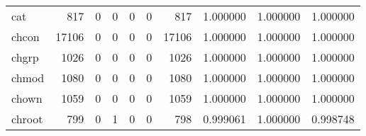 \begin{longtable}{lrrrrrrrrr}
cat       &                                                817 &                                                  0 &                                                  0 &                                                  0 &                                                  0 &                                                817 &                                           1.000000 &                               1.000000 &                             1.000000 \\
chcon     &                                              17106 &                                                  0 &                                                  0 &                                                  0 &                                                  0 &                                              17106 &                                           1.000000 &                               1.000000 &                             1.000000 \\
chgrp     &                                               1026 &                                                  0 &                                                  0 &                                                  0 &                                                  0 &                                               1026 &                                           1.000000 &                               1.000000 &                             1.000000 \\
chmod     &                                               1080 &                                                  0 &                                                  0 &                                                  0 &                                                  0 &                                               1080 &                                           1.000000 &                               1.000000 &                             1.000000 \\
chown     &                                               1059 &                                                  0 &                                                  0 &                                                  0 &                                                  0 &                                               1059 &                                           1.000000 &                               1.000000 &                             1.000000 \\
chroot    &                                                799 &                                                  0 &                                                  1 &                                                  0 &                                                  0 &                                                798 &                                           0.999061 &                               1.000000 &                             0.998748 \\

\end{longtable}
